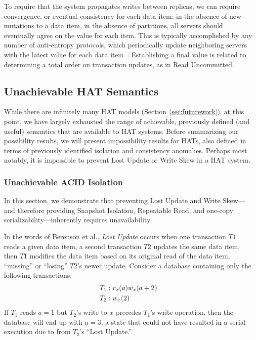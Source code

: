 \vspace{.5em} To require that the
system propagates writes between replicas, we can require convergence,
or eventual consistency for each data item: in the absence of new
mutations to a data item, in the absence of partitions, all servers
should eventually agree on the value for each item. This is typically
accomplished by any number of anti-entropy protocols, which
periodically update neighboring servers with the latest value for each
data item~\cite{antientropy}. Establishing a final value is related to
determining a total order on transaction updates, as in Read
Uncommitted.

\subsection{Unachievable HAT Semantics}
\label{sec:unachievable-hat}

While there are infinitely many HAT models
(Section~\ref{sec:futurework}), at this point, we have largely
exhausted the range of achievable, previously defined (and useful)
semantics that are available to HAT systems. Before summarizing our
possibility results, we will present impossibility results for HATs,
also defined in terms of previously identified isolation and
consistency anomalies. Perhaps most notably, it is impossible to
prevent Lost Update or Write Skew in a HAT system.

\subsubsection{Unachievable ACID Isolation}

In this section, we demonstrate that preventing Lost Update and Write
Skew---and therefore providing Snapshot Isolation, Repeatable Read,
and one-copy serializability---inherently requires unavailability.

In the words of Berenson et al., \textit{Lost Update} occurs when one
transaction $T1$ reads a given data item, a second transaction $T2$
updates the same data item, then $T1$ modifies the data item based on
its original read of the data item, ``missing'' or ``losing'' $T2$'s
newer update. Consider a database containing only the following
transactions:
\begin{align*}
\small
T_1 &: r_x(a) w_x(a+2)
\\T_2 &: w_x(2)
\end{align*}
If $T_1$ reads $a=1$ but $T_2$'s write to $x$ precedes $T_1$'s write
operation, then the database will end up with $a=3$, a state that
could not have resulted in a serial execution due to from $T_2$'s
``Lost Update.''

